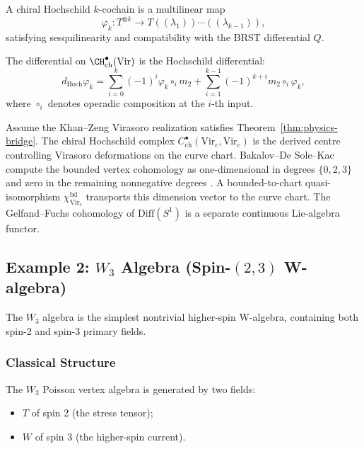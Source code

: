 \begin{definition}
A chiral Hochschild $k$-cochain is a multilinear map
\begin{equation}
\varphi_k: T^{\otimes k} \to T((\lambda_1))\cdots((\lambda_{k-1})),
\end{equation}
satisfying sesquilinearity and compatibility with the BRST differential $Q$.
\end{definition}

The differential on $\CH^\bullet_{\text{ch}}(\text{Vir})$ is the Hochschild differential:
\begin{equation}
d_{\text{Hoch}} \varphi_k = \sum_{i=0}^k (-1)^i \varphi_k \circ_i m_2 + \sum_{i=1}^{k-1} (-1)^{k+i} m_2 \circ_i \varphi_k,
\end{equation}
where $\circ_i$ denotes operadic composition at the $i$-th input.

\begin{proposition}
Assume the Khan--Zeng Virasoro realization satisfies
Theorem~\ref{thm:physics-bridge}.
The chiral Hochschild complex $C^\bullet_{\mathrm{ch}}(\mathrm{Vir}_c,
\mathrm{Vir}_c)$ is the derived centre controlling Virasoro
deformations on the curve chart.  Bakalov--De Sole--Kac compute the
bounded vertex cohomology as one-dimensional in degrees
$\{0,2,3\}$ and zero in the remaining nonnegative degrees
\cite[Theorem~7.2]{BDSK21}.  A bounded-to-chart quasi-isomorphism
$\chi^{\mathrm{bd}}_{\mathrm{Vir}_c}$ transports this dimension vector
to the curve chart.  The Gelfand--Fuchs cohomology of
$\mathrm{Diff}(S^1)$ is a separate continuous Lie-algebra functor.
\end{proposition}

\subsection{Example 2: $W_3$ Algebra (Spin-$(2,3)$ W-algebra)}

The $W_3$ algebra is the simplest nontrivial higher-spin W-algebra, containing both spin-2 and spin-3 primary fields.

\subsubsection{Classical Structure}

The $W_3$ Poisson vertex algebra is generated by two fields:
\begin{itemize}
\item $T$ of spin 2 (the stress tensor);
\item $W$ of spin 3 (the higher-spin current).
\end{itemize}

